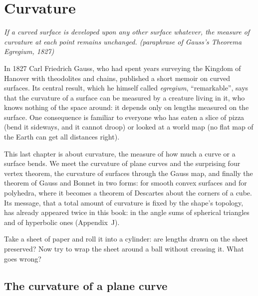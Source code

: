 \chapter{Curvature}\label{geometry:ch:curvature}

\begin{center}\itshape
If a curved surface is developed upon any other surface whatever, the measure of curvature at each point remains unchanged.
\upshape(paraphrase of Gauss's \emph{Theorema Egregium}, 1827)
\end{center}

In 1827 Carl Friedrich Gauss, who had spent years surveying the Kingdom of Hanover with theodolites and chains, published a short memoir on curved
surfaces. Its central result, which he himself called \emph{egregium}, ``remarkable'', says that the curvature of a surface can be measured by a creature
living in it, who knows nothing of the space around: it depends only on lengths measured on the surface. One consequence is familiar to everyone who has
eaten a slice of pizza (bend it sideways, and it cannot droop) or looked at a world map (no flat map of the Earth can get all distances right).

This last chapter is about curvature, the measure of how much a curve or a surface bends. We meet the curvature of plane curves and the surprising
four vertex theorem, the curvature of surfaces through the Gauss map, and finally the theorem of Gauss and Bonnet in two forms: for smooth convex surfaces
and for polyhedra, where it becomes a theorem of Descartes about the corners of a cube. Its message, that a total amount of curvature is fixed by the
shape's topology, has already appeared twice in this book: in the angle sums of spherical triangles and of hyperbolic ones (Appendix~J).

\begin{think}
Take a sheet of paper and roll it into a cylinder: are lengths drawn on the sheet preserved? Now try to wrap the sheet around a ball without creasing it.
What goes wrong?
\end{think}

\section{The curvature of a plane curve}

